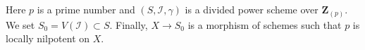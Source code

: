 \begin{situation}
\label{situation-global}
Here $p$ is a prime number and $(S, \mathcal{I}, \gamma)$ is a divided power
scheme over $\mathbf{Z}_{(p)}$. We set $S_0 = V(\mathcal{I}) \subset S$.
Finally, $X \to S_0$ is a morphism of schemes such that $p$ is
locally nilpotent on $X$.
\end{situation}